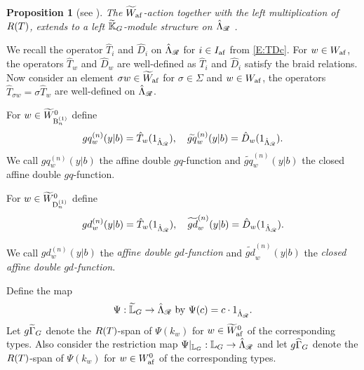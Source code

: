 \documentclass[a4paper]{amsart}
\newcommand{\ike}[1]{\todo[size=\tiny,color=blue!30]{#1}}
\newcommand{\smark}[1]{\todo[size=\tiny,color=cyan!30]{#1}}
\newtheorem{prop}[thm]{Proposition}
\theoremstyle{remark}
\numberwithin{equation}{section}
\begin{document}
\begin{prop}[{see \cite[Proposition 3.1]{ISY}}]\label{prop_kg_mod}
The $\Wafex$-action together with the 
left multiplication of $\RT$, extends to 
a left $\tKG$-module structure on $\hL_\sR$ .    
\end{prop}


 We recall the operator $\hat{T}_i$ and $\hat{D}_i$ on $\hL_{\sR}$ for $i\in I_\af$ from \eqref{E:TDc}. For $w\in W_\af$, the operators $\hat{T}_w$ and $\hat{D}_w$ are well-defined as $\hat{T}_i$ and $\hat{D}_i$ satisfy the braid relations. Now consider an element $\sigma w\in\Wx$ for $\sigma\in\Sigma$ and $w\in\Waf$, the operators  $\hat{T}_{\sigma w} = \sigma \hat{T}_w$ are well-defined on $\hL_{\sR}$.



For $w\in \WBexgr{n}$ define
$$gq^{(n)}_w(y| b) = \hat{T}_w(1_{\hL_{\sR}}), \quad \widetilde{gq}^{(n)}_w(y| b) = \hat{D}_w(1_{\hL_{\sR}}).$$
 We call $gq^{(n)}_w(y| b)$ the affine double $gq$-function and $\widetilde{gq}^{(n)}_w(y| b)$ the closed affine double $gq$-function.


For $w\in \WDexgr{n}$ define
$$\gd{w}{n}(y| b) = \hat{T}_w(1_{\hL_{\sR}}), \quad \tgd{w}{n}(y| b) = \hat{D}_w(1_{\hL_{\sR}}).$$

 We call $gd^{(n)}_w(y| b)$ the \emph{affine double $gd$-function} and $\widetilde{gd}^{(n)}_w(y| b)$ the \emph{closed affine double $gd$-function}.





Define the map $$\Psi:\tLG\to \hL_{\sR} \text{ by }\Psi(c) = c\cdot 1_{\hL_{\sR}}.$$ Let $\gGtil_{G}$ denote the $\RT$-span of $\Psi(k_w)$ for $w\in \Wafexgr$ of the corresponding types. Also consider the restriction map $\Psi|_{\LG}: \LG \to \hL_{\sR}$ and let $\gGhat_{G}$ denote the $\RT$-span of $\Psi(k_w)$ for $w\in \Wafgr$ of the corresponding types.
\end{document}
